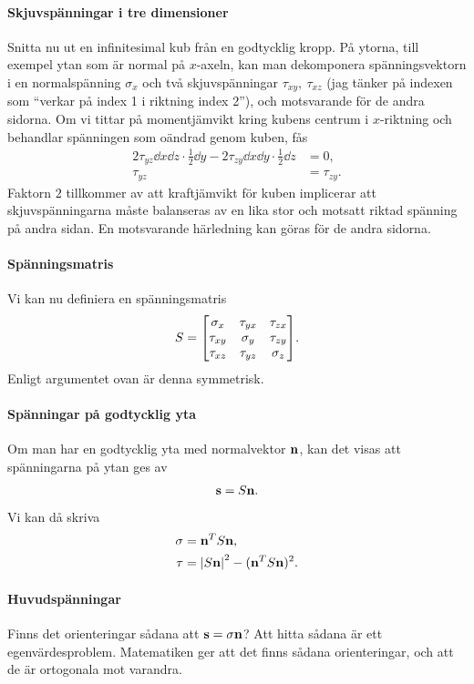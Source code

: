 \paragraph{Skjuvspänningar i tre dimensioner}
Snitta nu ut en infinitesimal kub från en godtycklig kropp. På ytorna, till exempel ytan som är normal på $x$-axeln, kan man dekomponera spänningsvektorn i en normalspänning $\sigma_{x}$ och två skjuvspänningar $\tau_{xy},\ \tau_{xz}$ (jag tänker på indexen som ``verkar på index 1 i riktning index 2''), och motsvarande för de andra sidorna. Om vi tittar på momentjämvikt kring kubens centrum i $x$-riktning och behandlar spänningen som oändrad genom kuben, fås
\begin{align*}
	2\tau_{yz}\dd{x}\dd{z}\cdot\frac{1}{2}\dd{y} - 2\tau_{zy}\dd{x}\dd{y}\cdot\frac{1}{2}\dd{z}        &= 0, \\
	\tau_{yz} &= \tau_{zy}.
\end{align*}
Faktorn $2$ tillkommer av att kraftjämvikt för kuben implicerar att skjuvspänningarna måste balanseras av en lika stor och motsatt riktad spänning på andra sidan. En motsvarande härledning kan göras för de andra sidorna.

\paragraph{Spänningsmatris}
Vi kan nu definiera en spänningsmatris
\begin{align*}
	S =
	\mqty[
		\sigma_{x} & \tau_{yx}  & \tau_{zx} \\
		\tau_{xy}  & \sigma_{y} & \tau_{zy} \\
		\tau_{xz}  & \tau_{yz}  & \sigma_{z}
	].
\end{align*}
Enligt argumentet ovan är denna symmetrisk.

\paragraph{Spänningar på godtycklig yta}
Om man har en godtycklig yta med normalvektor $\vb{n}$, kan det visas att spänningarna på ytan ges av
\begin{align*}
	\vb{s} = S\vb{n}.
\end{align*}
Vi kan då skriva
\begin{align*}
	\sigma &= \vb{n}^{T}S\vb{n}, \\
	\tau   &= \abs{S\vb{n}}^{2} - (\vb{n}^{T}S\vb{n})^{2}.
\end{align*}

\paragraph{Huvudspänningar}
Finns det orienteringar sådana att $\vb{s} = \sigma\vb{n}$? Att hitta sådana är ett egenvärdesproblem. Matematiken ger att det finns sådana orienteringar, och att de är ortogonala mot varandra.

